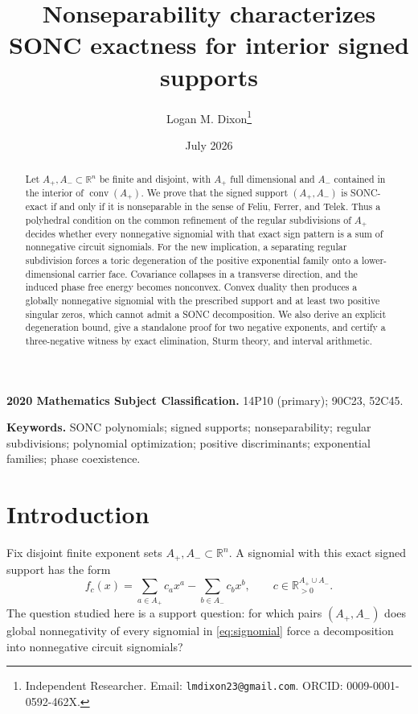\documentclass[11pt]{article}
\title{Nonseparability characterizes SONC exactness for interior signed supports}
\author{Logan M. Dixon\thanks{Independent Researcher. Email:
\texttt{lmdixon23@gmail.com}. ORCID: 0009-0001-0592-462X.}}
\date{July 2026}
\theoremstyle{plain}
\theoremstyle{definition}
\theoremstyle{remark}
\newcommand{\R}{\mathbb R}
\newcommand{\conv}{\operatorname{conv}}
\begin{document}
\maketitle

\begin{abstract}
Let $A_+,A_-\subset\R^n$ be finite and disjoint, with $A_+$ full dimensional and $A_-$ contained in the interior of $\conv(A_+)$. We prove that the signed support $(A_+,A_-)$ is SONC-exact if and only if it is nonseparable in the sense of Feliu, Ferrer, and Telek. Thus a polyhedral condition on the common refinement of the regular subdivisions of $A_+$ decides whether every nonnegative signomial with that exact sign pattern is a sum of nonnegative circuit signomials. For the new implication, a separating regular subdivision forces a toric degeneration of the positive exponential family onto a lower-dimensional carrier face. Covariance collapses in a transverse direction, and the induced phase free energy becomes nonconvex. Convex duality then produces a globally nonnegative signomial with the prescribed support and at least two positive singular zeros, which cannot admit a SONC decomposition. We also derive an explicit degeneration bound, give a standalone proof for two negative exponents, and certify a three-negative witness by exact elimination, Sturm theory, and interval arithmetic.
\end{abstract}

\medskip
\noindent\textbf{2020 Mathematics Subject Classification.} 14P10 (primary); 90C23, 52C45.

\smallskip
\noindent\textbf{Keywords.} SONC polynomials; signed supports; nonseparability; regular subdivisions; polynomial optimization; positive discriminants; exponential families; phase coexistence.

\section{Introduction}

Fix disjoint finite exponent sets $A_+,A_-\subset\R^n$. A signomial with this exact signed support has the form
\begin{equation}\label{eq:signomial}
 f_c(x)=\sum_{a\in A_+}c_a x^a-\sum_{b\in A_-}c_bx^b,
 \qquad c\in\R_{>0}^{A_+\cup A_-}.
\end{equation}
The question studied here is a support question: for which pairs $(A_+,A_-)$ does global nonnegativity of every signomial in \eqref{eq:signomial} force a decomposition into nonnegative circuit signomials?
\end{document}

